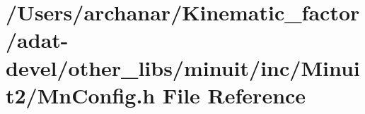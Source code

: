 \hypertarget{adat-devel_2other__libs_2minuit_2inc_2Minuit2_2MnConfig_8h}{}\section{/\+Users/archanar/\+Kinematic\+\_\+factor/adat-\/devel/other\+\_\+libs/minuit/inc/\+Minuit2/\+Mn\+Config.h File Reference}
\label{adat-devel_2other__libs_2minuit_2inc_2Minuit2_2MnConfig_8h}
